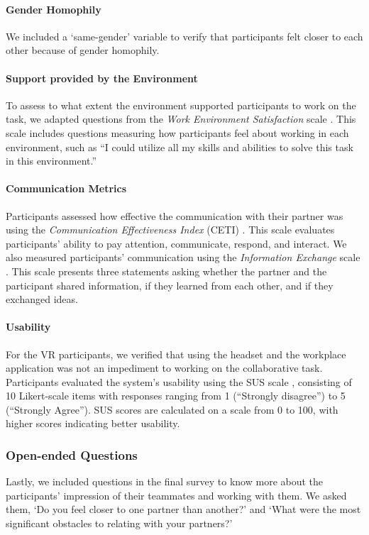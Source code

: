 \paragraph{Gender Homophily} We included a `same-gender' variable to verify that participants felt closer to each other because of gender homophily. 

\paragraph{Support provided by the Environment} To assess to what extent the environment supported participants to work on the task, we adapted questions from the \textit{Work Environment Satisfaction} scale \cite{tenorio2020syncmeet}. This scale includes questions measuring how participants feel about working in each environment, such as ``I could utilize all my skills and abilities to solve this task in this environment.''

\paragraph{Communication Metrics} Participants assessed how effective the communication with their partner was using the \textit{Communication Effectiveness Index} (CETI) \cite{lomas1989communicative}. This scale evaluates participants' ability to pay attention, communicate, respond, and interact. We also measured participants' communication using the \textit{Information Exchange} scale \cite{subramaniam2005influence}. This scale presents three statements asking whether the partner and the participant shared information, if they learned from each other, and if they exchanged ideas. 

\paragraph{Usability}
For the VR participants, we verified that using the headset and the workplace application was not an impediment to working on the collaborative task. Participants evaluated the system's usability using the SUS scale \cite{brooke1996sus}, consisting of 10 Likert-scale items with responses ranging from 1 (``Strongly disagree'') to 5 (``Strongly Agree''). SUS scores are calculated on a scale from 0 to 100, with higher scores indicating better usability.



\subsubsection{Open-ended Questions}
Lastly, we included questions in the final survey to know more about the participants' impression of their teammates and working with them. We asked them, `Do you feel closer to one partner than another?' and `What were the most significant obstacles to relating with your partners?'

